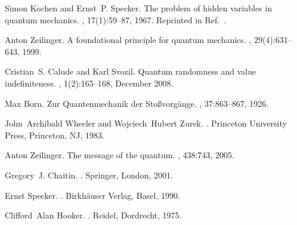 \documentclass[12pt]{article}
\begin{document}
\begin{thebibliography}{10}
Simon Kochen and Ernst~P. Specker.
\newblock The problem of hidden variables in quantum mechanics.
, 17(1):59--87, 1967.
\newblock Reprinted in Ref.~\cite[pp. 235--263]{specker-ges}.

Anton Zeilinger.
\newblock A foundational principle for quantum mechanics.
, 29(4):631--643, 1999.

Cristian~S. Calude and Karl Svozil.
\newblock Quantum randomness and value indefiniteness.
, 1(2):165--168, December 2008.

Max Born.
\newblock Zur {Q}uantenmechanik der {S}to{\ss}vorg{\"{a}}nge.
, 37:863--867, 1926.

John~Archibald Wheeler and Wojciech~Hubert Zurek.
.
\newblock Princeton University Press, Princeton, NJ, 1983.

Anton Zeilinger.
\newblock The message of the quantum.
, 438:743, 2005.

Gregory~J. Chaitin.
.
\newblock Springer, London, 2001.

Ernst Specker.
.
\newblock Birkh{\"{a}}user Verlag, Basel, 1990.

Clifford~Alan Hooker.
.
\newblock Reidel, Dordrecht, 1975.

\end{thebibliography}
\end{document}
